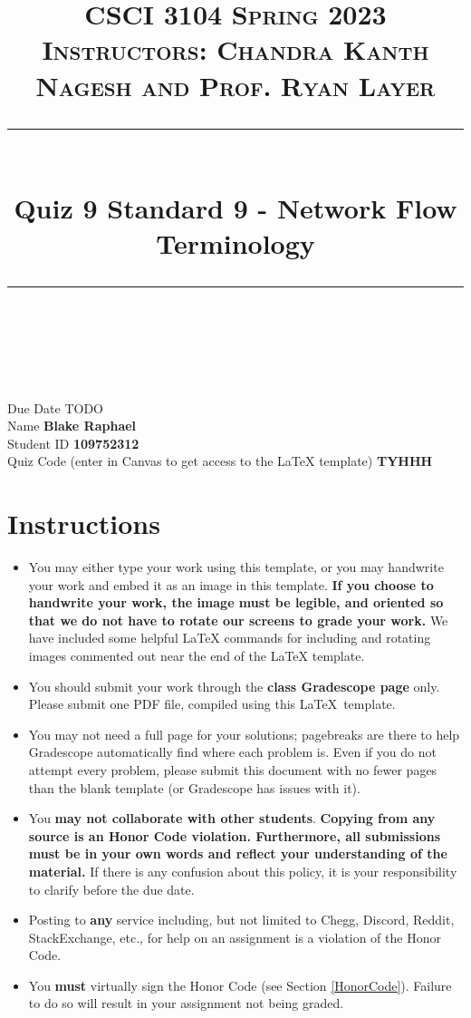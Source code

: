\documentclass[11pt]{article}
\title{
\normalfont \normalsize 
\textsc{CSCI 3104 Spring 2023 \\ 
Instructors: Chandra Kanth Nagesh and Prof. Ryan Layer} \\
[10pt] 
\rule{\linewidth}{0.5pt} \\[6pt] 
\huge Quiz 9 Standard 9 - Network Flow Terminology \\
\rule{\linewidth}{2pt}  \\[10pt]
}
\date{}
\theoremstyle{definition}
\theoremstyle{definition}
\theoremstyle{definition}
\begin{document}

\maketitle


\noindent
Due Date \dotfill TODO \\
Name \dotfill \textbf{Blake Raphael} \\
Student ID \dotfill \textbf{109752312} \\
Quiz Code (enter in Canvas to get access to the LaTeX template) \dotfill \textbf{TYHHH}


\tableofcontents

\section*{Instructions}
 \begin{itemize}
	\item You may either type your work using this template, or you may handwrite your work and embed it as an image in this template. \textbf{If you choose to handwrite your work, the image must be legible, and oriented so that we do not have to rotate our screens to grade your work.} We have included some helpful LaTeX commands for including and rotating images commented out near the end of the LaTeX template.
	\item You should submit your work through the \textbf{class Gradescope page} only. Please submit one PDF file, compiled using this \LaTeX \ template.
	\item You may not need a full page for your solutions; pagebreaks are there to help Gradescope automatically find where each problem is. Even if you do not attempt every problem, please submit this document with no fewer pages than the blank template (or Gradescope has issues with it).

	\item You \textbf{may not collaborate with other students}. \textbf{Copying from any source is an Honor Code violation. Furthermore, all submissions must be in your own words and reflect your understanding of the material.} If there is any confusion about this policy, it is your responsibility to clarify before the due date. 

	\item Posting to \textbf{any} service including, but not limited to Chegg, Discord, Reddit, StackExchange, etc., for help on an assignment is a violation of the Honor Code.

	\item You \textbf{must} virtually sign the Honor Code (see Section \ref{HonorCode}). Failure to do so will result in your assignment not being graded.
\end{itemize}
\end{document}
